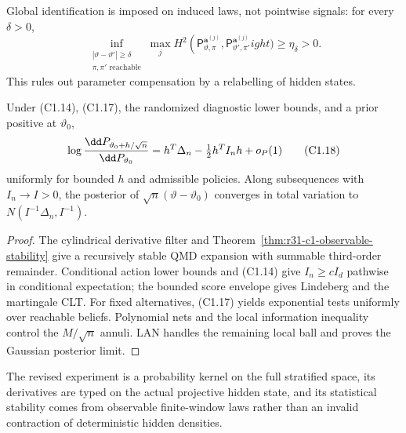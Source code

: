 Global identification is imposed on induced laws, not pointwise signals:
for every $\delta>0$,
\[
 \inf_{\substack{|\vartheta-\vartheta'|\ge\delta\\
                  \pi,\pi'\text{ reachable}}}
 \max_j H^2\left(
 \mathsf P_{\vartheta,\pi}^{\mathbf a^{(j)}},
 \mathsf P_{\vartheta',\pi'}^{\mathbf a^{(j)}}
ight)
 \ge\eta_\delta>0.                                      \tag{C1.17}
\]
This rules out parameter compensation by a relabelling of hidden states.

\begin{theorem}
\label{thm:r31-c1-bvm}
Under (C1.14), (C1.17), the randomized diagnostic lower bounds, and a prior
positive at $\vartheta_0$,
\[
 \log{\dd P_{\vartheta_0+h/\sqrt n}\over\dd P_{\vartheta_0}}
 =h^T\Delta_n-\tfrac12h^TI_nh+o_P(1)                     \tag{C1.18}
\]
uniformly for bounded $h$ and admissible policies.  Along subsequences with
$I_n\to I>0$, the posterior of
$\sqrt n(\vartheta-\vartheta_0)$ converges in total variation to
$N(I^{-1}\Delta_n,I^{-1})$.
\end{theorem}

\begin{proof}
The cylindrical derivative filter and
Theorem~\ref{thm:r31-c1-observable-stability} give a recursively stable QMD
expansion with summable third-order remainder.  Conditional action lower
bounds and (C1.14) give $I_n\ge cI_d$ pathwise in conditional expectation; the
bounded score envelope gives Lindeberg and the martingale CLT.  For fixed
alternatives, (C1.17) yields exponential tests uniformly over reachable
beliefs.  Polynomial nets and the local information inequality control the
$M/\sqrt n$ annuli.  LAN handles the remaining local ball and proves the
Gaussian posterior limit.
\end{proof}

The revised experiment is a probability kernel on the full stratified space,
its derivatives are typed on the actual projective hidden state, and its
statistical stability comes from observable finite-window laws rather than an
invalid contraction of deterministic hidden densities.
